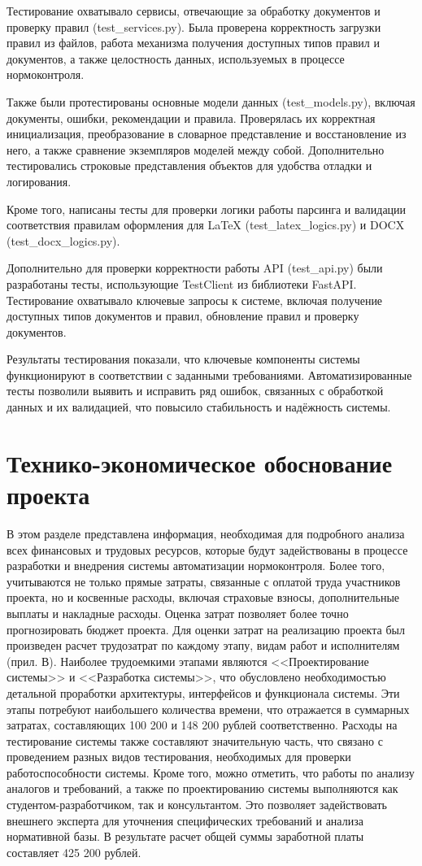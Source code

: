 \documentclass{report}
\begin{document}
Тестирование охватывало сервисы, отвечающие за обработку документов и проверку правил (test\_services.py). Была проверена корректность загрузки правил из файлов, работа механизма получения доступных типов правил и документов, а также целостность данных, используемых в процессе нормоконтроля.

Также были протестированы основные модели данных (test\_models.py), включая документы, ошибки, рекомендации и правила. Проверялась их корректная инициализация, преобразование в словарное представление и восстановление из него, а также сравнение экземпляров моделей между собой. Дополнительно тестировались строковые представления объектов для удобства отладки и логирования.

Кроме того, написаны тесты для проверки логики работы парсинга и валидации соответствия правилам оформления для LaTeX (test\_latex\_logics.py) и DOCX (test\_docx\_logics.py).

Дополнительно для проверки корректности работы API (test\_api.py) были разработаны тесты, использующие TestClient из библиотеки FastAPI. Тестирование охватывало ключевые запросы к системе, включая получение доступных типов документов и правил, обновление правил и проверку документов.

Результаты тестирования показали, что ключевые компоненты системы функционируют в соответствии с заданными требованиями. Автоматизированные тесты позволили выявить и исправить ряд ошибок, связанных с обработкой данных и их валидацией, что повысило стабильность и надёжность системы.

\section{Технико-экономическое обоснование проекта}

В этом разделе представлена информация, необходимая для подробного анализа всех финансовых и трудовых ресурсов, которые будут задействованы в процессе разработки и внедрения системы автоматизации нормоконтроля. Более того, учитываются не только прямые затраты, связанные с оплатой труда участников проекта, но и косвенные расходы, включая страховые взносы, дополнительные выплаты и накладные расходы. Оценка затрат позволяет более точно прогнозировать бюджет проекта.
Для оценки затрат на реализацию проекта был произведен расчет трудозатрат по каждому этапу, видам работ и исполнителям (прил. В). Наиболее трудоемкими этапами являются <<Проектирование системы>> и <<Разработка системы>>, что обусловлено необходимостью детальной проработки архитектуры, интерфейсов и функционала системы. Эти этапы потребуют наибольшего количества времени, что отражается в суммарных затратах, составляющих 100 200 и 148 200 рублей соответственно.
Расходы на тестирование системы также составляют значительную часть, что связано с проведением разных видов тестирования, необходимых для проверки работоспособности системы. 
Кроме того, можно отметить, что работы по анализу аналогов и требований, а также по проектированию системы выполняются как студентом-разработчиком, так и консультантом. Это позволяет задействовать внешнего эксперта для уточнения специфических требований и анализа нормативной базы. 
В результате расчет общей суммы заработной платы составляет 425 200 рублей.
\end{document}
